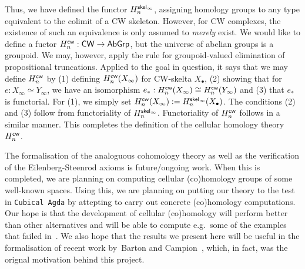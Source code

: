 \documentclass[a4page]{article}
\begin{document}
Thus, we have defined the functor $\textnormal{\ensuremath{H^{\mathsf{skel}_\infty}_{n}}}$, assigning homology groups to any type equivalent to the colimit of a CW skeleton. However, for CW complexes, the existence of such an equivalence is only assumed to \emph{merely} exist. We would like to define a fuctor $\textnormal{\ensuremath{H^{\mathsf{cw}}_{n}}} : \mathsf{CW} \to \textnormal{\ensuremath{\mathsf{AbGrp}}}$, but the universe of abelian groups is a groupoid. We may, however, apply the rule for groupoid-valued elimination of propositional truncations. Applied to the goal in question, it says that we may define $\textnormal{\ensuremath{H^{\mathsf{cw}}_{n}}}$ by (1) defining $\textnormal{\ensuremath{H^{\mathsf{cw}}_{n}}}(X_\infty)$ for CW-skelta $X_\bullet$, (2) showing that for $e : X_\infty \simeq Y_{\infty}$, we have an isomorphism $e_* : \textnormal{\ensuremath{H^{\mathsf{cw}}_{n}}}(X_\infty) \cong \textnormal{\ensuremath{H^{\mathsf{cw}}_{n}}}(Y_\infty)$ and (3) that $e_*$ is functorial. For (1), we simply set $\textnormal{\ensuremath{H^{\mathsf{cw}}_{n}}}(X_\infty) := \textnormal{\ensuremath{H^{\mathsf{skel}_\infty}_{n}}}(X_\bullet)$. The conditions (2) and (3) follow from functoriality of $\textnormal{\ensuremath{H^{\mathsf{skel}_\infty}_{n}}}$. Functoriality of $\textnormal{\ensuremath{H^{\mathsf{cw}}_{n}}}$ follows in a similar manner. This completes the definition of the cellular homology theory $\textnormal{\ensuremath{H^{\mathsf{cw}}_{n}}}$.

The formalisation of the analoguous cohomology theory as well as the verification of the Eilenberg-Steenrod axioms is future/ongoing work. When this is completed, we are planning on computing cellular (co)homology groups of some well-known spaces. Using this, we are planning on putting our theory to the test in \texttt{Cubical Agda} by attepting to carry out concrete (co)homology computations. Our hope is that the development of cellular (co)homology will perform better than other alternatives and will be able to compute e.g.\ some of the examples that failed in~\cite[Section 6]{BLM22}. We also hope that the results we present here will be useful in the formalisation of recent work by~Barton and Campion~\cite{SerreFiniteness}, which, in fact, was the orignal motivation behind this project.

\printbibliography
\end{document}
